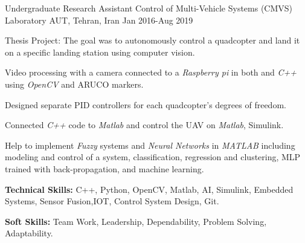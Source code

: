 \begin{cventries}
  \cventry
    {Undergraduate Research Assistant}  %
    {Control of Multi-Vehicle Systems (CMVS) Laboratory} %
    {AUT, Tehran, Iran} %
    {Jan 2016-Aug 2019} %
    {
      \begin{cvitems} %
            \item{Thesis Project: The goal was to autonomously control a quadcopter and land it on a specific landing station using computer vision.}
          \item{Video processing with a camera connected to a \textit{Raspberry pi} in both  and \textit{C++ } using \textit{OpenCV} and ARUCO markers.}
          \item{Designed separate PID controllers for each quadcopter's degrees of freedom.}
          \item{Connected \textit{C++ }code to \textit{Matlab} and control the UAV  on \textit{Matlab}, Simulink.}
          \item {Help to implement \textit{Fuzzy} systems and \textit{Neural Networks} in \textit{MATLAB} including modeling and control of a system, classification, regression and clustering, MLP trained with back-propagation, and machine learning.}
        \item {\textbf{Technical Skills:} C++, Python, OpenCV, Matlab, AI, Simulink, Embedded Systems, Sensor Fusion,IOT, Control System Design, Git.}
        \item {\textbf{Soft Skills:} Team Work, Leadership, Dependability, Problem Solving, Adaptability.}
      \end{cvitems}
    }   
 

\end{cventries}
